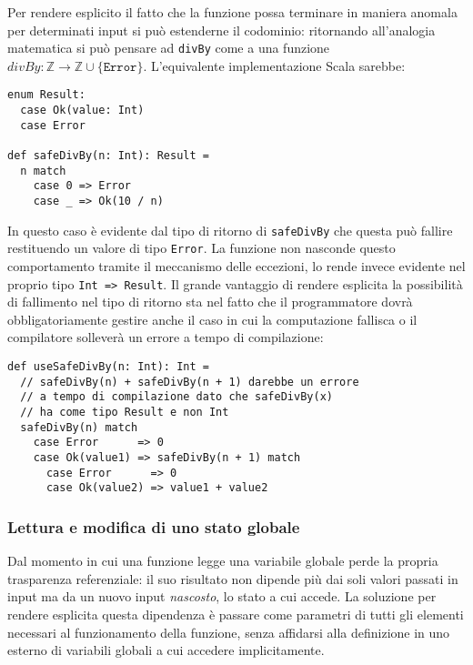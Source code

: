 Per rendere esplicito il fatto che la funzione possa terminare in maniera anomala per determinati input si può estenderne il codominio: ritornando all'analogia matematica si può pensare ad \lstinline{divBy} come a una funzione $divBy : \mathbb{Z} \rightarrow \mathbb{Z} \cup \{ \texttt{Error} \}$.
  L'equivalente implementazione Scala sarebbe:
  \begin{lstlisting}[language=scala3]
enum Result:
  case Ok(value: Int)
  case Error

def safeDivBy(n: Int): Result =
  n match
    case 0 => Error
    case _ => Ok(10 / n)
\end{lstlisting}
  In questo caso è evidente dal tipo di ritorno di \lstinline|safeDivBy| che questa può fallire restituendo un valore di tipo \lstinline{Error}.
  La funzione non nasconde questo comportamento tramite il meccanismo delle eccezioni, lo rende invece evidente nel proprio tipo \lstinline{Int => Result}.
  Il grande vantaggio di rendere esplicita la possibilità di fallimento nel tipo di ritorno sta nel fatto che il programmatore dovrà obbligatoriamente gestire anche il caso in cui la computazione fallisca o il compilatore solleverà un errore a tempo di compilazione:
  \begin{lstlisting}[language=scala3]
def useSafeDivBy(n: Int): Int =
  // safeDivBy(n) + safeDivBy(n + 1) darebbe un errore
  // a tempo di compilazione dato che safeDivBy(x)
  // ha come tipo Result e non Int
  safeDivBy(n) match
    case Error      => 0
    case Ok(value1) => safeDivBy(n + 1) match
      case Error      => 0
      case Ok(value2) => value1 + value2
\end{lstlisting}

  \subsubsection{Lettura e modifica di uno stato globale}
  \label{lettura-e-modifica-di-uno-stato-globale}

  Dal momento in cui una funzione legge una variabile globale perde la propria trasparenza referenziale: il suo risultato non dipende più dai soli valori passati in input ma da un nuovo input \emph{nascosto}, lo stato a cui accede.
  La soluzione per rendere esplicita questa dipendenza è passare come parametri di tutti gli elementi necessari al funzionamento della funzione, senza affidarsi alla definizione in uno  esterno di variabili globali a cui accedere implicitamente.

